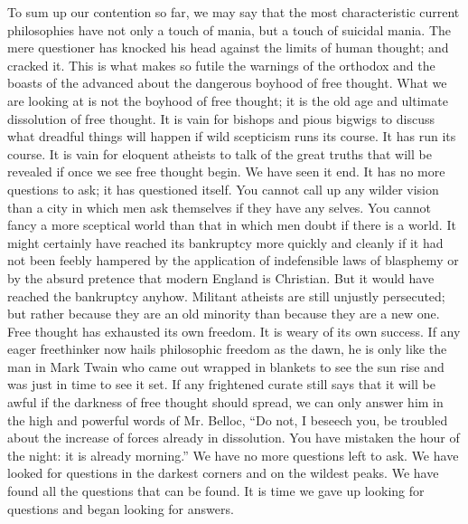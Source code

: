 \documentclass{book}
\begin{document}
To sum up our contention so far, we may say that the most characteristic current philosophies have not only a touch of mania, but a touch of suicidal mania. The mere questioner has knocked his head against the limits of human thought; and cracked it. This is what makes so futile the warnings of the orthodox and the boasts of the advanced about the dangerous boyhood of free thought. What we are looking at is not the boyhood of free thought; it is the old age and ultimate dissolution of free thought. It is vain for bishops and pious bigwigs to discuss what dreadful things will happen if wild scepticism runs its course. It has run its course. It is vain for eloquent atheists to talk of the great truths that will be revealed if once we see free thought begin. We have seen it end. It has no more questions to ask; it has questioned itself. You cannot call up any wilder vision than a city in which men ask themselves if they have any selves. You cannot fancy a more sceptical world than that in which men doubt if there is a world. It might certainly have reached its bankruptcy more quickly and cleanly if it had not been feebly hampered by the application of indefensible laws of blasphemy or by the absurd pretence that modern England is Christian. But it would have reached the bankruptcy anyhow. Militant atheists are still unjustly persecuted; but rather because they are an old minority than because they are a new one. Free thought has exhausted its own freedom. It is weary of its own success. If any eager freethinker now hails philosophic freedom as the dawn, he is only like the man in Mark Twain who came out wrapped in blankets to see the sun rise and was just in time to see it set. If any frightened curate still says that it will be awful if the darkness of free thought should spread, we can only answer him in the high and powerful words of Mr. Belloc, “Do not, I beseech you, be troubled about the increase of forces already in dissolution. You have mistaken the hour of the night: it is already morning.” We have no more questions left to ask. We have looked for questions in the darkest corners and on the wildest peaks. We have found all the questions that can be found. It is time we gave up looking for questions and began looking for answers.
\end{document}
